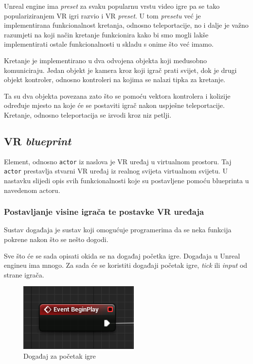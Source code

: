 \documentclass[a4paper,10pt]{article}
\begin{document}
Unreal engine ima \textit{preset} za svaku popularnu vrstu video igre pa se
tako populariziranjem VR igri razvio i VR \textit{preset}. U tom
\textit{presetu} već je implementirana funkcionalnost kretanja, odnosno
teleportacije, no i dalje je važno razumjeti na koji način kretanje funkcionira
kako bi smo mogli lakše implementirati ostale funkcionalnosti u skladu s onime
što već imamo.

Kretanje je implementirano u dva odvojena objekta koji međusobno komuniciraju.
Jedan objekt je kamera kroz koji igrač prati svijet, dok je drugi objekt
kontroler, odnosno kontroleri na kojima se nalazi tipka za kretanje.

Ta su dva objekta povezana zato što se pomoću vektora kontrolera i kolizije
određuje mjesto na koje će se postaviti igrač nakon uspješne teleportacije.
Kretanje, odnosno teleportacija se izvodi kroz niz petlji.

\subsection{VR \textit{blueprint}}

Element, odnosno \texttt{actor} iz naslova je VR uređaj u virtualnom prostoru.
Taj \texttt{actor} prestavlja stvarni VR uređaj iz realnog svijeta virtualnom
svijetu. U nastavku slijedi opis svih funkcionalnosti koje su postavljene
pomoću blueprinta u navedenom actoru.

\subsubsection{Postavljanje visine igrača te postavke VR uređaja}
   

Sustav događaja je sustav koji omogućuje programerima da se neka funkcija
pokrene nakon što se nešto dogodi.

Sve što će se sada opisati okida se na događaj početka igre. Događaja  u Unreal
engineu ima mnogo. Za sada će se koristiti događaji početak igre, \textit{tick}
ili \textit{input} od strane igrača.

\begin{figure}[!h]
	\centering
	\includegraphics[]{slike/01.png}
	\caption{Događaj za početak igre}
\end{figure}
\end{document}
